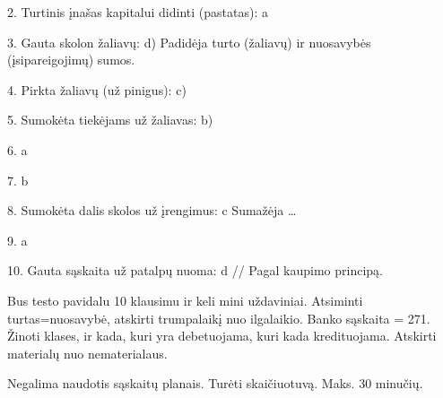 2. Turtinis įnašas kapitalui didinti (pastatas):
a

3. Gauta skolon žaliavų:
d) Padidėja turto (žaliavų) ir nuosavybės (įsipareigojimų) sumos.

4.  Pirkta žaliavų (už pinigus):
c)

5. Sumokėta tiekėjams už žaliavas:
b)

6.
a

7.
b

8. Sumokėta dalis skolos už įrengimus:
c Sumažėja …

9.
a

10. Gauta sąskaita už patalpų nuoma:
d 
// Pagal kaupimo principą.

Bus testo pavidalu 10 klausimu ir keli mini uždaviniai.
Atsiminti turtas=nuosavybė, atskirti trumpalaikį nuo ilgalaikio.
Banko sąskaita = 271.
Žinoti klases, ir kada, kuri yra debetuojama, kuri kada kredituojama.
Atskirti materialų nuo nematerialaus.

Negalima naudotis sąskaitų planais.
Turėti skaičiuotuvą.
Maks. 30 minučių.
